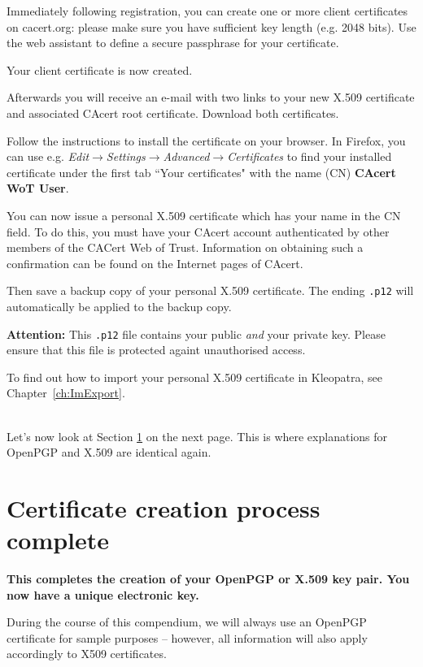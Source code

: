 \documentclass[a4paper,11pt,oneside,openright,titlepage]{scrbook}
\newcommand{\Menu}[1]{\textit{#1}}
\newcommand{\Filename}[1]{\small{\texttt{#1}}\normalsize}
\newcommand{\Email}{e-mail}
\begin{document}
Immediately following registration, you can create one or more client
certificates on cacert.org: please make sure you have sufficient key
length (e.g.  2048 bits). Use the web assistant to define a secure
passphrase for your certificate.

Your client certificate is now created.

Afterwards you will receive an \Email{} with two
links to your new X.509 certificate and associated CAcert root
certificate. Download both certificates.

Follow the instructions to install the certificate on your browser. In
Firefox, you can use e.g.
\Menu{Edit$\rightarrow$Settings$\rightarrow$Advanced$\rightarrow$Certificates}
to find your installed certificate under the first tab ``Your
certificates" with the name (CN) \textbf{CAcert WoT User}.

You can now issue a personal X.509 certificate which has your name in
the CN field. To do this, you must have your CAcert account
authenticated by other members of the CACert Web of Trust. Information
on obtaining such a confirmation can be found on the Internet pages of
CAcert.

Then save a backup copy of your personal X.509 certificate. The
ending \Filename{.p12} will automatically be applied
to the backup copy.

\textbf{Attention:} This \Filename{.p12} file contains your
public \textit{and } your private key. Please ensure that this file is
protected againt unauthorised access.

To find out how to import your personal X.509 certificate in
Kleopatra, see Chapter~\ref{ch:ImExport}.

~\\ Let's now look at Section \ref{sec_finishKeyPairGeneration} on the
next page. This is where explanations for OpenPGP and X.509 are
identical again.


\clearpage
\section{Certificate creation process complete}
\label{sec_finishKeyPairGeneration}

\textbf{This completes the creation of your OpenPGP or X.509 key pair.
You now have a unique electronic key.}

During the course of this compendium, we will always use an OpenPGP
certificate for sample purposes -- however, all information will also
apply accordingly to X509 certificates.
\end{document}
